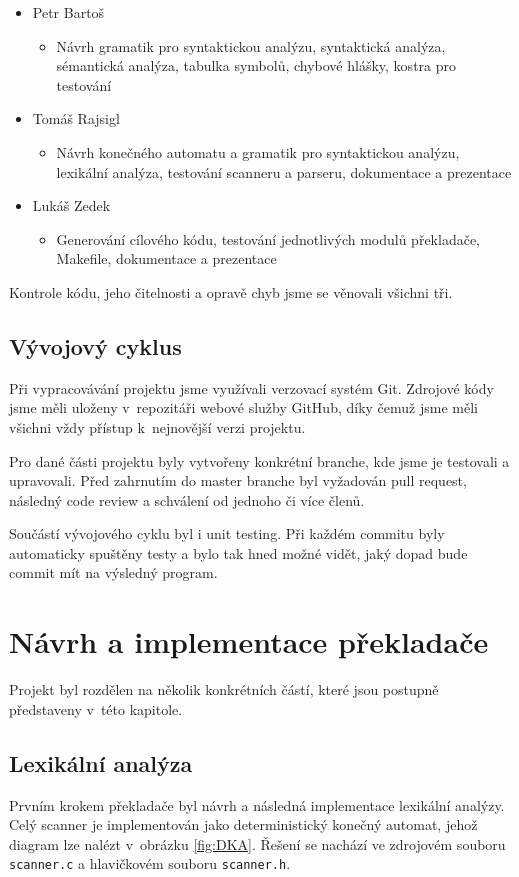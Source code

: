 \documentclass[a4paper,12pt]{article}
\begin{document}
\begin{itemize}
	\item Petr Bartoš
	      \begin{itemize}
	      	\item Návrh gramatik pro syntaktickou analýzu, syntaktická analýza, sémantická analýza, tabulka symbolů, chybové hlášky, kostra pro testování
	      \end{itemize}
	\item Tomáš Rajsigl 
	      \begin{itemize}
	      	\item Návrh konečného automatu a gramatik pro syntaktickou analýzu, lexikální analýza, testování scanneru a parseru, dokumentace a prezentace
	      \end{itemize}
	\item Lukáš Zedek
	      \begin{itemize}
	      	\item Generování cílového kódu, testování jednotlivých modulů překladače, Makefile, dokumentace a  prezentace
	      \end{itemize}
\end{itemize}
Kontrole kódu, jeho čitelnosti a opravě chyb jsme se věnovali všichni tři.
\subsection{Vývojový cyklus}
Při vypracovávání projektu jsme využívali verzovací systém Git. Zdrojové kódy jsme měli uloženy v~repozitáři webové služby GitHub, díky čemuž jsme měli všichni vždy přístup k~nejnovější verzi projektu. 

Pro dané části projektu byly vytvořeny konkrétní branche, kde jsme je testovali a upravovali. Před zahrnutím do master branche byl vyžadován pull request, následný code review a schválení od jednoho či více členů. 

Součástí vývojového cyklu byl i unit testing. Při každém commitu byly automaticky spuštěny testy a bylo tak hned možné vidět, jaký dopad bude commit mít na výsledný program.
\clearpage

\section{Návrh a implementace překladače}
Projekt byl rozdělen na několik konkrétních částí, které jsou postupně představeny v~této kapitole.

\subsection{Lexikální analýza}
Prvním krokem překladače byl návrh a následná implementace lexikální analýzy. Celý scanner je implementován jako deterministický konečný automat, jehož diagram lze nalézt v~obrázku \ref{fig:DKA}. Řešení se nachází ve zdrojovém souboru \verb|scanner.c| a hlavičkovém souboru \verb|scanner.h|.
\end{document}
